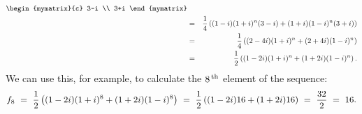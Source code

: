 \begin{solution}
\begin{eqnarray*}
        \begin{mymatrix}{c} 3-i \\ 3+i \end{mymatrix} \\
    &=& \frac{1}{4}\paren{(1-i)(1+i)^n(3-i) + (1+i)(1-i)^n(3+i)} \\
    &=& \frac{1}{4}\paren{(2-4i)(1+i)^n + (2+4i)(1-i)^n} \\
    &=& \frac{1}{2}\paren{(1-2i)(1+i)^n + (1+2i)(1-i)^n}.
  \end{eqnarray*}
  We can use this, for example, to calculate the $8^{\,\rm th}$ element of the
  sequence:
  \begin{equation*}
    f_8
    ~=~ \frac{1}{2}\left((1-2i)(1+i)^8 + (1+2i)(1-i)^8\right)
    ~=~ \frac{1}{2}\left((1-2i)16 + (1+2i)16\right)
    ~=~ \frac{32}{2}
    ~=~ 16.
  \end{equation*}

\end{solution}
